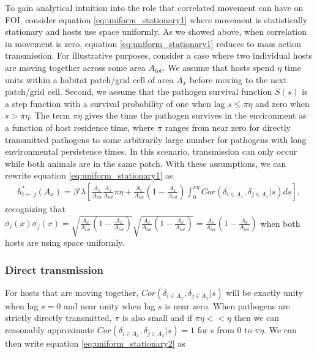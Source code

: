\documentclass[letterpaper]{article}
\begin{document}
To gain analytical intuition into the role that correlated movement can have on FOI, consider equation \ref{eq:uniform_stationary1} where movement is statistically stationary and hosts use space uniformly.  As we showed above, when correlation in movement is zero, equation \ref{eq:uniform_stationary1} reduces to mass action transmission. 
For illustrative purposes, consider a case where two individual hosts are moving together across some area $A_{tot}$. We assume that hosts spend $\eta$ time units within a habitat patch/grid cell of area $A_x$ before moving to the next patch/grid cell. Second, we assume that the pathogen survival function $S(s)$ is a step function with a survival probability of one when lag $s \leq \pi \eta$ and zero when $s > \pi \eta$.  
The term $\pi \eta$ gives the time the pathogen survives in the environment as a function of host residence time, where $\pi$ ranges from near zero for directly transmitted pathogens to some arbitrarily large number for pathogens with long environmental persistence times.  
In this scenario, transmission can only occur while both animals are in the same patch. With these assumptions, we can rewrite equation \ref{eq:uniform_stationary1} as 
\begin{equation}
    \begin{aligned}
        h^*_{i \leftarrow j}(A_x) = \beta' \lambda \left[\frac{A_x}{A_{tot}}\frac{A_x}{A_{tot}} \pi \eta + \frac{A_x}{A_{tot}}(1 - \frac{A_x}{A_{tot}}) \int_{0}^{\pi \eta} Cor(\delta_{i \in A_x}, \delta_{j \in A_x} | s) ds\right],
    \end{aligned}
    \label{eq:uniform_stationary2}
\end{equation}
recognizing that $\sigma_i(x) \sigma_j(x) = \sqrt{\frac{A_x}{A_{tot}}(1 - \frac{A_x}{A_{tot}})}\sqrt{\frac{A_x}{A_{tot}}(1 - \frac{A_x}{A_{tot}})} = \frac{A_x}{A_{tot}}(1 - \frac{A_x}{A_{tot}})$ when both hosts are using space uniformly.

\subsubsection*{Direct transmission}

For hosts that are moving together, $Cor(\delta_{i \in A_x}, \delta_{j \in A_x} | s)$ will be exactly unity when lag $s = 0$ and near unity when lag $s$ is near zero. When pathogens are strictly directly transmitted, $\pi$ is also small and if $\pi \eta << \eta$ then we can reasonably approximate $Cor(\delta_{i \in A_x}, \delta_{j \in A_x} | s) = 1$ for s from 0 to $\pi \eta$.  We can then write equation \ref{eq:uniform_stationary2} as 
\end{document}
